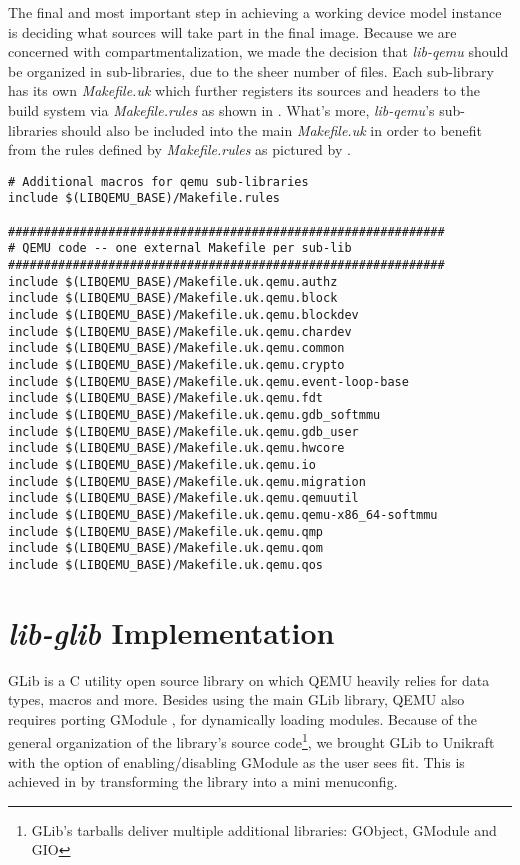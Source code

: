 The final and most important step in achieving a working device model instance is deciding what sources will take part in the final image.
Because we are concerned with compartmentalization, we made the decision that \textit{lib-qemu} should be organized in sub-libraries, due to the sheer number of files.
Each sub-library has its own \textit{Makefile.uk} which further registers its sources and headers to the build system via \textit{Makefile.rules} as shown in .
What's more, \textit{lib-qemu}'s sub-libraries should also be included into the main \textit{Makefile.uk} in order to benefit from the rules defined by \textit{Makefile.rules} as pictured by .

\begin{lstlisting}
# Additional macros for qemu sub-libraries
include $(LIBQEMU_BASE)/Makefile.rules

#############################################################
# QEMU code -- one external Makefile per sub-lib
#############################################################
include $(LIBQEMU_BASE)/Makefile.uk.qemu.authz
include $(LIBQEMU_BASE)/Makefile.uk.qemu.block
include $(LIBQEMU_BASE)/Makefile.uk.qemu.blockdev
include $(LIBQEMU_BASE)/Makefile.uk.qemu.chardev
include $(LIBQEMU_BASE)/Makefile.uk.qemu.common
include $(LIBQEMU_BASE)/Makefile.uk.qemu.crypto
include $(LIBQEMU_BASE)/Makefile.uk.qemu.event-loop-base
include $(LIBQEMU_BASE)/Makefile.uk.qemu.fdt
include $(LIBQEMU_BASE)/Makefile.uk.qemu.gdb_softmmu
include $(LIBQEMU_BASE)/Makefile.uk.qemu.gdb_user
include $(LIBQEMU_BASE)/Makefile.uk.qemu.hwcore
include $(LIBQEMU_BASE)/Makefile.uk.qemu.io
include $(LIBQEMU_BASE)/Makefile.uk.qemu.migration
include $(LIBQEMU_BASE)/Makefile.uk.qemu.qemuutil
include $(LIBQEMU_BASE)/Makefile.uk.qemu.qemu-x86_64-softmmu
include $(LIBQEMU_BASE)/Makefile.uk.qemu.qmp
include $(LIBQEMU_BASE)/Makefile.uk.qemu.qom
include $(LIBQEMU_BASE)/Makefile.uk.qemu.qos
\end{lstlisting}

\section{\textit{lib-glib} Implementation}
\label{sec:impl-lib-glib}

GLib \cite{glib} is a C utility open source library on which QEMU heavily relies for data types, macros and more.
Besides using the main GLib library, QEMU also requires porting GModule \cite{gmodule}, for dynamically loading modules.
Because of the general organization of the library's source code\footnote{GLib's tarballs deliver multiple additional libraries: GObject, GModule and GIO}, we brought GLib to Unikraft with the option of enabling/disabling GModule as the user sees fit.
This is achieved in  by transforming the library into a mini menuconfig.

